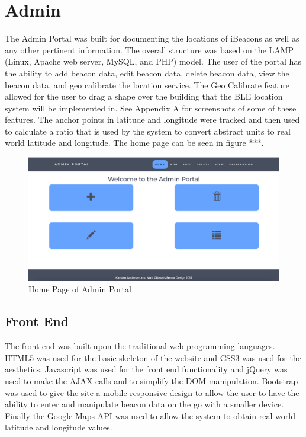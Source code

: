 \section{Admin}
The Admin Portal was built for documenting the locations of iBeacons as well as any other pertinent information. The overall
structure was based on the LAMP (Linux, Apache web server, MySQL, and PHP) model. The user of the portal has the ability to add beacon data, edit beacon data,
delete beacon data, view the beacon data, and geo calibrate the location service. The Geo Calibrate feature allowed for the
user to drag a shape over the building that the BLE location system will be implemented in. See Appendix A for screenshots of some of these features. The anchor points in latitude
and longitude were tracked and then used to calculate a ratio that is used by the system to convert abstract units to
real world latitude and longitude. The home page can be seen in figure ***.

\begin{figure}
\includegraphics[width=1\textwidth]{images/homeAdmin.png}
\caption{Home Page of Admin Portal}
\end{figure}

\subsection{Front End}
The front end was built upon the traditional web programming languages. HTML5 was used for the basic skeleton of the website
and CSS3 was used for the aesthetics. Javascript was used for the front end functionality and jQuery was used to make the AJAX calls
and to simplify the DOM manipulation. Bootstrap was used to give the site a mobile responsive design to allow the user to have the ability
to enter and manipulate beacon data on the go with a smaller device. Finally the Google Maps API was used to allow the system to obtain
real world latitude and longitude values.

